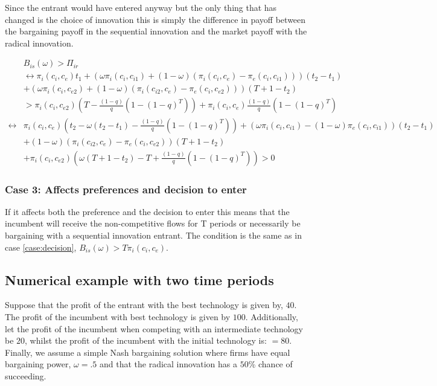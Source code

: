 \documentclass[11pt]{article}
\begin{document}
Since the entrant would have entered anyway but the only thing that has changed is the choice of innovation this is simply the difference in payoff between the bargaining payoff in the sequential innovation and the market payoff with the radical innovation. 

\begin{align*}
&B_{is}(\omega)>\Pi_{ir}
\\
& \leftrightarrow \pi_i(c_i,c_{e})t_1 
+(\omega \pi_i(c_i,c_{i1})+(1-\omega)(\pi_i(c_i,c_{e})-\pi_e(c_i,c_{i1})))(t_2-t_1)
\\&+(\omega \pi_i(c_i,c_{e2})+(1-\omega)(\pi_i(c_{i2},c_e)-\pi_e(c_{i},c_{e2})))(T+1-t_2)  \\
&> \pi_{i}(c_i,c_{e2}) \left( T - \frac{(1-q)}{q} \left( 1-(1-q)^T \right) \right)
+\pi_i(c_i,c_e) \frac{(1-q)}{q} \left( 1-(1-q)^T \right) \\
\leftrightarrow &\pi_i(c_i,c_e)(t_2 -\omega(t_2-t_1)-\frac{(1-q)}{q} \left( 1-(1-q)^T \right)) 
+(\omega \pi_i(c_i,c_{i1})-(1-\omega)\pi_e(c_i,c_{i1}))(t_2-t_1) \\
& +(1-\omega)(\pi_i(c_{i2},c_e)-\pi_e(c_{i},c_{e2}))(T+1-t_2) \\
&+ \pi_i(c_{i},c_{e2})\left(\omega(T+1-t_2)-T+\frac{(1-q)}{q} \left( 1-(1-q)^T \right)\right)
> 0
\end{align*}

\subsubsection{Case 3: Affects preferences and decision to enter}\label{case:both}

If it affects both the preference and the decision to enter this means that the incumbent will receive the non-competitive flows for T periods or necessarily be bargaining with a sequential innovation entrant. The condition is the same as in case \ref{case:decision}, $ B_{is}(\omega)>T \pi_i(c_i,c_e)$.

\subsection{Numerical example with two time periods}

Suppose that the profit of the entrant with the best technology is given by, $40$. The profit of the incumbent with best technology is given by $100$. Additionally, let the profit of the incumbent when competing with an intermediate technology be $20$, whilst the profit of the incumbent with the initial technology is: $=80$. Finally, we assume a simple Nash bargaining solution where firms have equal bargaining power, $\omega = .5$ and that the radical innovation has a $50$\% chance of succeeding. 
\end{document}
